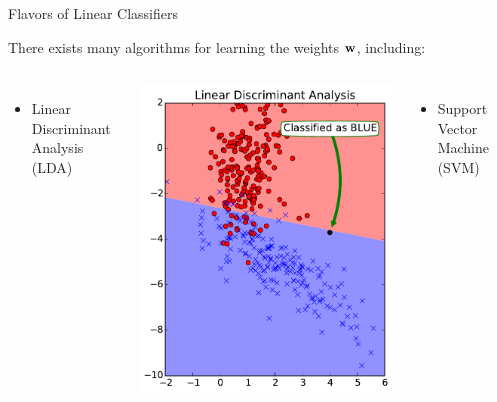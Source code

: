 \documentclass[10pt, aspectratio=169]{beamer} %
\newcommand{\w}{{\bf w}}
\begin{document}
\begin{frame}{Flavors of Linear Classifiers}

There exists many algorithms for learning the weights $\w$, including:

{\footnotesize\em
\begin{columns}
\hspace*{0.3cm}
\begin{itemize}
\item Linear Discriminant Analysis (LDA)
\end{itemize}
\centerline{\includegraphics[width=\columnwidth]{LDA.pdf}}
\begin{itemize}
\item Support Vector Machine (SVM)
\end{itemize}

\end{columns}}
\end{frame}
\end{document}
